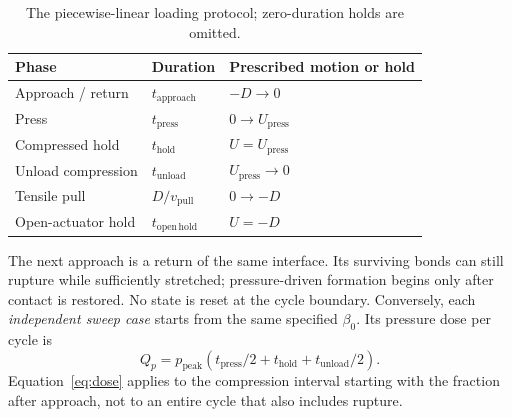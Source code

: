 \documentclass[11pt,a4paper]{article}
\begin{document}
\begin{table}[htbp]
\centering\small
\caption{The piecewise-linear loading protocol; zero-duration holds are omitted.}
\begin{tabularx}{\linewidth}{@{}l l Y@{}}
\toprule
Phase & Duration & Prescribed motion or hold\\
\midrule
Approach / return & $t_{\mathrm{approach}}$ & $-D\longrightarrow0$\\
Press & $t_{\mathrm{press}}$ & $0\longrightarrow U_{\mathrm{press}}$\\
Compressed hold & $t_{\mathrm{hold}}$ & $U=U_{\mathrm{press}}$\\
Unload compression & $t_{\mathrm{unload}}$ & $U_{\mathrm{press}}\longrightarrow0$\\
Tensile pull & $D/v_{\mathrm{pull}}$ & $0\longrightarrow-D$\\
Open-actuator hold & $t_{\mathrm{open\,hold}}$ & $U=-D$\\
\bottomrule
\end{tabularx}
\end{table}

The next approach is a return of the same interface. Its surviving bonds can
still rupture while sufficiently stretched; pressure-driven formation begins
only after contact is restored. No state is reset at the cycle boundary.
Conversely, each \emph{independent sweep case} starts from the same specified
$\beta_0$. Its pressure dose per cycle is
\begin{equation}
 Q_p=p_{\mathrm{peak}}\left(t_{\mathrm{press}}/2+t_{\mathrm{hold}}
                                      +t_{\mathrm{unload}}/2\right).
\end{equation}
Equation~\eqref{eq:dose} applies to the compression interval starting with the
fraction after approach, not to an entire cycle that also includes rupture.
\end{document}
